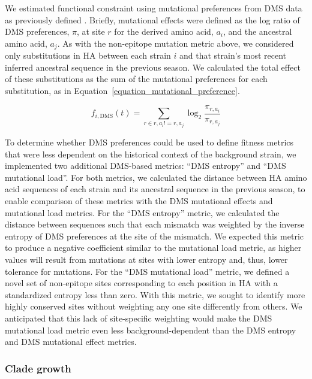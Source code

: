 We estimated functional constraint using mutational preferences from DMS data as previously defined \citep{Lee2018}.
Briefly, mutational effects were defined as the log ratio of DMS preferences, $\pi$, at site $r$ for the derived amino acid, $a_{i}$, and the ancestral amino acid, $a_{j}$.
As with the non-epitope mutation metric above, we considered only substitutions in HA between each strain $i$ and that strain's most recent inferred ancestral sequence in the previous season.
We calculated the total effect of these substitutions as the sum of the mutational preferences for each substitution, as in Equation~\ref{equation_mutational_preference}.

\begin{equation}
    f_{i,\mathrm{DMS}}(t) = \sum_{r \in r,a_{i} != r,a_{j}}\log_{2}\frac{\pi_{r,a_{i}}}{\pi_{r,a_{j}}}
    \label{equation_mutational_preference}
\end{equation}

To determine whether DMS preferences could be used to define fitness metrics that were less dependent on the historical context of the background strain, we implemented two additional DMS-based metrics: ``DMS entropy'' and ``DMS mutational load''.
For both metrics, we calculated the distance between HA amino acid sequences of each strain and its ancestral sequence in the previous season, to enable comparison of these metrics with the DMS mutational effects and mutational load metrics.
For the ``DMS entropy'' metric, we calculated the distance between sequences such that each mismatch was weighted by the inverse entropy of DMS preferences at the site of the mismatch.
We expected this metric to produce a negative coefficient similar to the mutational load metric, as higher values will result from mutations at sites with lower entropy and, thus, lower tolerance for mutations.
For the ``DMS mutational load'' metric, we defined a novel set of non-epitope sites corresponding to each position in HA with a standardized entropy less than zero.
With this metric, we sought to identify more highly conserved sites without weighting any one site differently from others.
We anticipated that this lack of site-specific weighting would make the DMS mutational load metric even less background-dependent than the DMS entropy and DMS mutational effect metrics.

\subsubsection*{Clade growth}

